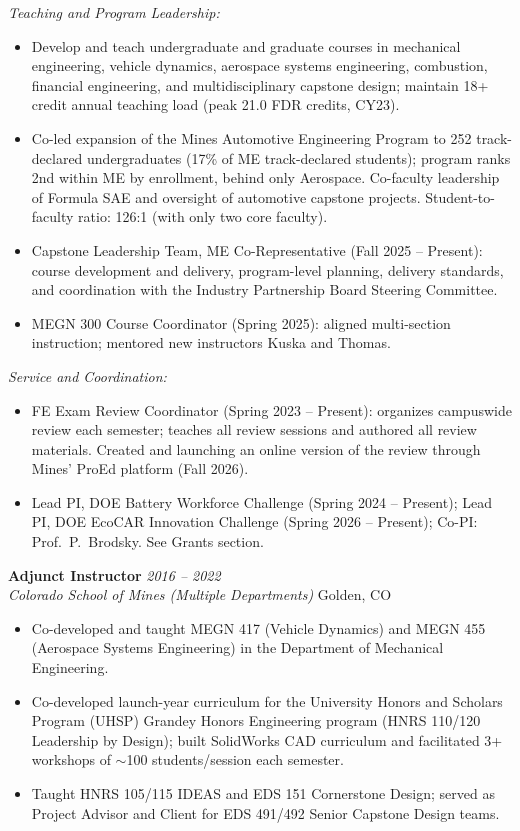 \documentclass[11pt,letterpaper]{article}
\newcommand{\cventry}[4]{%
  \noindent\textbf{#1} \hfill \textit{#2}\\
  \textit{#3} \hfill #4\vspace{3pt}}
\begin{document}
\noindent\textit{Teaching and Program Leadership:}
\begin{itemize}
  \item Develop and teach undergraduate and graduate courses in mechanical engineering,
        vehicle dynamics, aerospace systems engineering, combustion, financial
        engineering, and multidisciplinary capstone design; maintain 18+ credit annual
        teaching load (peak 21.0 FDR credits, CY23).
  \item Co-led expansion of the Mines Automotive Engineering Program to 252
        track-declared undergraduates (17\% of ME track-declared students);
        program ranks 2nd within ME by enrollment, behind only Aerospace.
        Co-faculty leadership of Formula SAE and oversight of automotive capstone
        projects. Student-to-faculty ratio: 126:1 (with only two core faculty).
  \item Capstone Leadership Team, ME Co-Representative (Fall 2025 -- Present):
        course development and delivery, program-level planning, delivery standards,
        and coordination with the Industry Partnership Board Steering Committee.
  \item MEGN 300 Course Coordinator (Spring 2025): aligned multi-section instruction;
        mentored new instructors Kuska and Thomas.
\end{itemize}

\noindent\textit{Service and Coordination:}
\begin{itemize}
  \item FE Exam Review Coordinator (Spring 2023 -- Present): organizes campuswide
        review each semester; teaches all review sessions and authored all review
        materials. Created and launching an online version of the review through
        Mines' ProEd platform (Fall 2026).
  \item Lead PI, DOE Battery Workforce Challenge (Spring 2024 -- Present); Lead PI,
        DOE EcoCAR Innovation Challenge (Spring 2026 -- Present); Co-PI: Prof.\ P.\ Brodsky. See Grants section.
\end{itemize}

\medskip
\cventry{Adjunct Instructor}{2016 -- 2022}
  {Colorado School of Mines (Multiple Departments)}{Golden, CO}
\begin{itemize}
  \item Co-developed and taught MEGN 417 (Vehicle Dynamics) and MEGN 455 (Aerospace
        Systems Engineering) in the Department of Mechanical Engineering.
  \item Co-developed launch-year curriculum for the University Honors and Scholars
        Program (UHSP) Grandey Honors Engineering program (HNRS 110/120 Leadership by
        Design); built SolidWorks CAD curriculum and facilitated 3+ workshops of
        $\sim$100 students/session each semester.
  \item Taught HNRS 105/115 IDEAS and EDS 151 Cornerstone Design; served as Project
        Advisor and Client for EDS 491/492 Senior Capstone Design teams.
\end{itemize}
\end{document}

